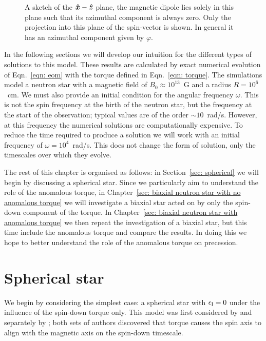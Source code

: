 \documentclass[../full_thesis/full_thesis.tex]{subfiles}
\newcommand{\thisdir}{../rotating_frame}
\begin{document}
\begin{figure}[ht]
\centering

\caption{A sketch of the  $\boldsymbol{\hat{x}}-\boldsymbol{\hat{z}}$ plane,  the magnetic dipole lies solely in
this plane such that its azimuthal component is always zero.  Only the
projection into this plane of the spin-vector is shown. In general it has an
azimuthal component given by $\varphi$.}
	\label{fig: sketch01}
\end{figure}

In the following sections we will develop our intuition for the different types
of solutions to this model. These results are calculated by exact numerical
evolution of Eqn.~\eqref{eqn: eom} with the torque defined in Eqn.~\eqref{eqn:
torque}. The simulations model a neutron star with a magnetic field of
$B_{0}\approx10^{13}$~G and a radius $R=10^{6}$~cm. We must also provide an
initial condition for the angular frequency $\omega$. This is not the spin
frequency at the birth of the neutron star, but the frequency at the start of
the observation; typical values are of the order $\sim 10$~rad/s. However, at
this frequency the numerical solutions are computationally expensive. To reduce
the time required to produce a solution we will work with an initial frequency
of $\omega = 10^{4}$~rad/s. This does not change the form of solution, only the
timescales over which they evolve.

The rest of this chapter is organised as follows: in Section~\ref{sec:
spherical} we will begin by discussing a spherical star. Since we particularly
aim to understand the role of the anomalous torque, in Chapter~\ref{sec:
biaxial neutron star with no anomalous torque} we will investigate a biaxial
star acted on by only the spin-down component of the torque. In
Chapter~\ref{sec: biaxial neutron star with anomalous torque} we then repeat
the investigation of a biaxial star, but this time include the anomalous torque
and compare the results. In doing this we hope to better understand the role of
the anomalous torque on precession.

\section{Spherical star}
\label{sec: spherical}

We begin by considering the simplest case: a spherical star with $\epsilon_{\mathrm{I}}=0$
under the influence of the spin-down torque only. This model was first considered
by \citet{Davis1970} and separately by \citet{Michel1970}; both sets of authors
discovered that torque causes the spin axis to align with the magnetic axis on
the spin-down timescale.
\end{document}
